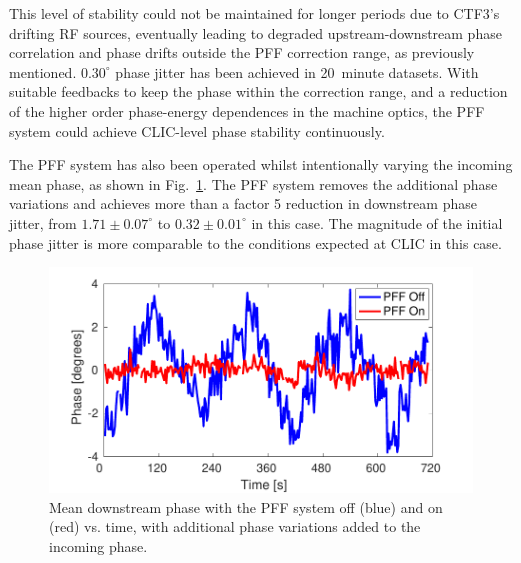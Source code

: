 \documentclass[%
 reprint,
superscriptaddress,
 amsmath,amssymb,
 prl,
]{revtex4-1}
\begin{document}
This level of stability could not be maintained for longer periods due to 
CTF3's drifting RF sources, eventually leading to degraded 
upstream-downstream phase correlation and phase drifts outside the PFF 
correction range, as previously mentioned. \(0.30^\circ\) phase jitter has been 
achieved in 20~minute datasets. With suitable feedbacks to keep the phase 
within the correction range, and a reduction of the higher order phase-energy 
dependences in the machine optics, the PFF system could achieve CLIC-level 
phase stability continuously.

The PFF system has also been operated 
whilst intentionally varying the incoming mean phase, as shown in 
Fig.~\ref{fig:wiggle}. The PFF system removes the additional phase variations 
and achieves more than a factor 5 reduction in downstream phase jitter, from 
\(1.71\pm0.07^\circ\) to \(0.32\pm0.01^\circ\) in this case. The magnitude of 
the initial phase jitter is more comparable to the conditions expected at CLIC 
in this case.

\begin{figure}
	\includegraphics[width=\columnwidth]{figs/wiggle}
	\caption{\label{fig:wiggle}Mean downstream phase with the PFF system off 
		(blue) and on (red) vs. time, with additional phase variations added to 
		the 
		incoming phase.}
\end{figure}

%
%
%
\end{document}
